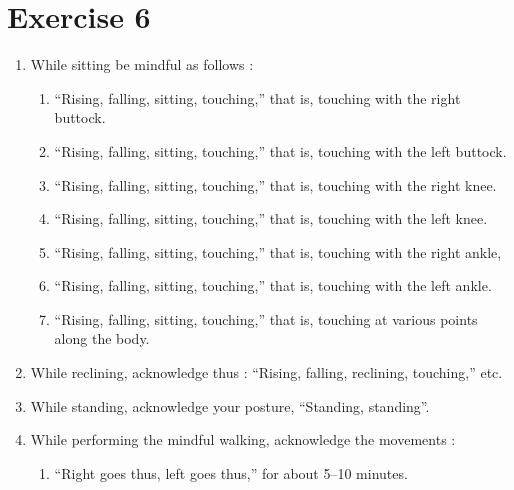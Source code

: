 \documentclass[a5paper,10pt,english]{book}
\begin{document}
\section{Exercise 6}
\label{\detokenize{practice:exercise-6}}\begin{enumerate}
%
\item {} 
\sphinxAtStartPar
While sitting be mindful as follows :
\begin{enumerate}
%
\item {} 
\sphinxAtStartPar
“Rising, falling, sitting, touching,” that is, touching with the right buttock.

\item {} 
\sphinxAtStartPar
“Rising, falling, sitting, touching,” that is, touching with the left buttock.

\item {} 
\sphinxAtStartPar
“Rising, falling, sitting, touching,” that is, touching with the right knee.

\item {} 
\sphinxAtStartPar
“Rising, falling, sitting, touching,” that is, touching with the left knee.

\item {} 
\sphinxAtStartPar
“Rising, falling, sitting, touching,” that is, touching with the right ankle,

\item {} 
\sphinxAtStartPar
“Rising, falling, sitting, touching,” that is, touching with the left ankle.

\item {} 
\sphinxAtStartPar
“Rising, falling, sitting, touching,” that is, touching at various points along the body.

\end{enumerate}

\item {} 
\sphinxAtStartPar
While reclining, acknowledge thus : “Rising, falling, reclining, touching,” etc.

\item {} 
\sphinxAtStartPar
While standing, acknowledge your posture, “Standing, standing”.

\item {} 
\sphinxAtStartPar
While performing the mindful walking, acknowledge the movements :
\begin{enumerate}
%
\item {} 
\sphinxAtStartPar
“Right goes thus, left goes thus,” for about 5–10 minutes.


\end{enumerate}
\end{enumerate}
\end{document}
